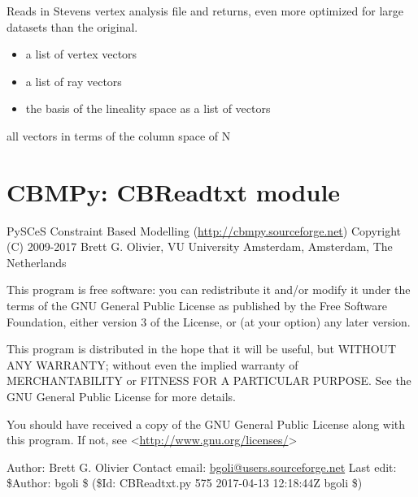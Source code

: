 \documentclass[a4paper,11pt,english]{sphinxmanual}
\begin{document}

\begin{fulllineitems}
\label{modules_doc:cbmpy.CBRead.readSK_vertexOld}
Reads in Stevens vertex analysis file and returns, even more optimized for large datasets than the original.
\begin{itemize}
\item {} 
a list of vertex vectors

\item {} 
a list of ray vectors

\item {} 
the basis of the lineality space as a list of vectors

\end{itemize}

all vectors in terms of the column space of N

\end{fulllineitems}

\label{modules_doc:module-cbmpy.CBReadtxt}

\section{CBMPy: CBReadtxt module}
\label{modules_doc:cbmpy-cbreadtxt-module}
PySCeS Constraint Based Modelling (\url{http://cbmpy.sourceforge.net})
Copyright (C) 2009-2017 Brett G. Olivier, VU University Amsterdam, Amsterdam, The Netherlands

This program is free software: you can redistribute it and/or modify
it under the terms of the GNU General Public License as published by
the Free Software Foundation, either version 3 of the License, or
(at your option) any later version.

This program is distributed in the hope that it will be useful,
but WITHOUT ANY WARRANTY; without even the implied warranty of
MERCHANTABILITY or FITNESS FOR A PARTICULAR PURPOSE.  See the
GNU General Public License for more details.

You should have received a copy of the GNU General Public License
along with this program.  If not, see \textless{}\url{http://www.gnu.org/licenses/}\textgreater{}

Author: Brett G. Olivier
Contact email: \href{mailto:bgoli@users.sourceforge.net}{bgoli@users.sourceforge.net}
Last edit: \$Author: bgoli \$ (\$Id: CBReadtxt.py 575 2017-04-13 12:18:44Z bgoli \$)
\end{document}

